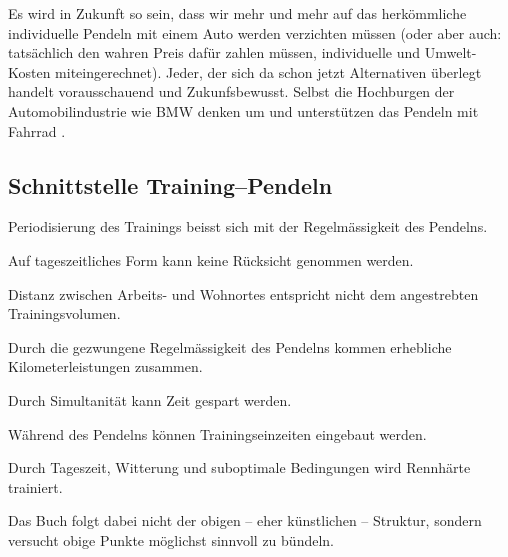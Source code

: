 Es wird in Zukunft so sein, dass wir mehr und mehr auf das herkömmliche
individuelle Pendeln mit einem Auto werden verzichten müssen (oder aber auch:
tatsächlich den wahren Preis dafür zahlen müssen, individuelle und
Umwelt-Kosten miteingerechnet). Jeder, der sich da schon jetzt Alternativen
überlegt handelt vorausschauend und Zukunfsbewusst. Selbst die Hochburgen der
Automobilindustrie wie BMW denken um und unterstützen das Pendeln mit Fahrrad
\cite{Hage2018bmwfahrrad}.

\subsection{Schnittstelle Training--Pendeln}


  \begin{itemize*}
    \item Periodisierung des Trainings beisst sich mit der Regelmässigkeit des Pendelns.
    \item Auf tageszeitliches Form kann keine Rücksicht genommen werden.
    \item Distanz zwischen Arbeits- und Wohnortes entspricht nicht dem angestrebten Trainingsvolumen.
  \end{itemize*}


  \begin{itemize*}
    \item Durch die gezwungene Regelmässigkeit des Pendelns kommen erhebliche Kilometerleistungen zusammen.
    \item Durch Simultanität kann Zeit gespart werden.
    \item Während des Pendelns können Trainingseinzeiten eingebaut werden.
    \item Durch Tageszeit, Witterung und suboptimale Bedingungen wird Rennhärte trainiert.
  \end{itemize*}

Das Buch folgt dabei nicht der obigen -- eher künstlichen -- Struktur, sondern versucht obige Punkte möglichst sinnvoll zu bündeln.


% 
% 
% 
% 



